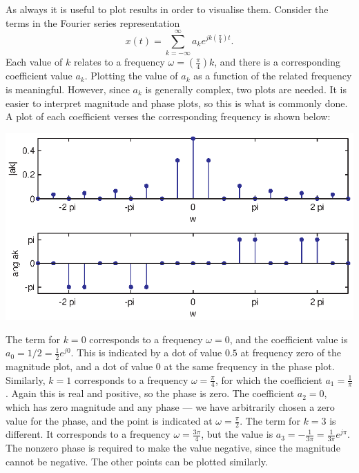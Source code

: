 \documentclass[10pt]{beamer}
\begin{document}
As always it is useful to plot results in order to visualise them.  Consider the terms in the Fourier series representation
\begin{equation*}
  x(t) = \sum_{k=-\infty}^{\infty} a_k e^{j k \left( \frac{\pi}{4} \right) t}.
\end{equation*}
Each value of $k$ relates to a frequency $\omega = \left( \frac{\pi}{4} \right) k$, and there is a corresponding coefficient value $a_k$.  Plotting the value of $a_k$ as a function of the related frequency is meaningful.  However, since $a_k$ is generally complex, two plots are needed.  It is easier to interpret magnitude and phase plots, so this is what is commonly done.  A plot of each coefficient verses the corresponding frequency is shown below:
\begin{center}
  \includegraphics{exrectpulsetrain2}
\end{center}
The term for $k=0$ corresponds to a frequency $\omega = 0$, and the coefficient value is $a_0 = 1/2 = \frac{1}{2} e^{j 0}$.  This is indicated by a dot of value $0.5$ at frequency zero of the magnitude plot, and a dot of value $0$ at the same frequency in the phase plot.  Similarly, $k=1$ corresponds to a frequency $\omega = \frac{\pi}{4}$, for which the coefficient $a_1 = \frac{1}{\pi}$.  Again this is real and positive, so the phase is zero.  The coefficient $a_2 = 0$, which has zero magnitude and any phase --- we have arbitrarily chosen a zero value for the phase, and the point is indicated at $\omega = \frac{\pi}{2}$.  The term for $k=3$ is different.  It corresponds to a frequency $\omega = \frac{3 \pi}{4}$, but the value is $a_3 = -\frac{1}{3 \pi} = \frac{1}{3 \pi} e^{j \pi}$.  The nonzero phase is required to make the value negative, since the magnitude cannot be negative.  The other points can be plotted similarly.
\end{document}
